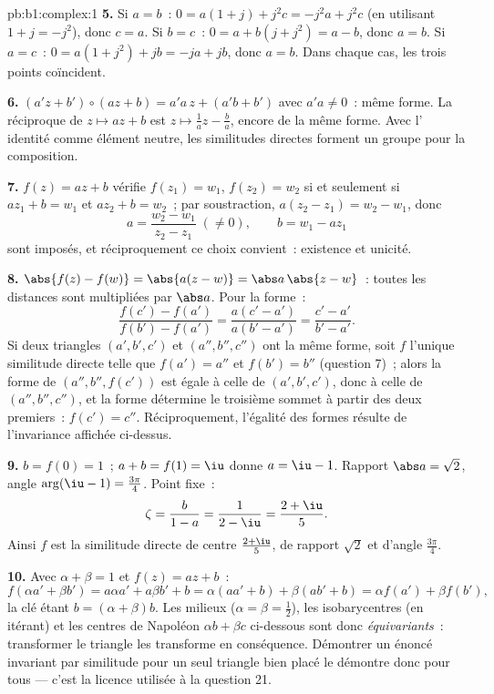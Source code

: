 \begin{solution}{pb:b1:complex:1}
\textbf{5.} Si $a = b$~: $0 = a(1 + j) + j^2 c = -j^2 a + j^2 c$ (en
utilisant $1 + j = -j^2$), donc $c = a$. Si $b = c$~: $0 = a + b(j +
j^2) = a - b$, donc $a = b$. Si $a = c$~: $0 = a(1 + j^2) + jb = -ja
+ jb$, donc $a = b$. Dans chaque cas, les trois points coïncident.

\textbf{6.} $(a'z + b') \circ (az + b) = a'a\,z + (a'b + b')$ avec
$a'a \neq 0$~: même forme. La réciproque de $z \mapsto az + b$ est
$z \mapsto \frac1a z - \frac ba$, encore de la même forme. Avec
l' identité comme élément neutre, les similitudes
directes forment un groupe pour la composition.

\textbf{7.} $f(z) = az + b$ vérifie $f(z_1) = w_1$, $f(z_2) = w_2$
si et seulement si $a z_1 + b = w_1$ et $a z_2 + b = w_2$~; par
soustraction, $a(z_2 - z_1) = w_2 - w_1$, donc
\[
a = \frac{w_2 - w_1}{z_2 - z_1} \;(\neq 0), \qquad
b = w_1 - a z_1
\]
sont imposés, et réciproquement ce choix convient~: existence et
unicité.

\textbf{8.} $\abs{f(z) - f(w)} = \abs{a(z - w)} = \abs a\,\abs{z -
w}$~: toutes les distances sont multipliées par $\abs a$. Pour la
forme~:
\[
\frac{f(c') - f(a')}{f(b') - f(a')} = \frac{a(c' -
a')}{a(b' - a')} = \frac{c' - a'}{b' - a'} .
\]
Si deux triangles $(a', b', c')$ et $(a'', b'', c'')$ ont la même
forme, soit $f$ l'unique similitude directe telle que $f(a') = a''$
et $f(b') = b''$ (question 7)~; alors la forme de $(a'', b'',
f(c'))$ est égale à celle de $(a', b', c')$, donc à celle de $(a'',
b'', c'')$, et la forme détermine le troisième sommet à partir des
deux premiers~: $f(c') = c''$. Réciproquement, l'égalité des formes
résulte de l'invariance affichée ci-dessus.

\textbf{9.} $b = f(0) = 1$~; $a + b = f(1) = \iu$ donne $a = \iu -
1$. Rapport $\abs a = \sqrt2$, angle $\arg(\iu - 1) =
\frac{3\pi}4$. Point fixe~:
\[
\zeta = \frac{b}{1 - a} = \frac1{2 - \iu} = \frac{2 + \iu}5 .
\]
Ainsi $f$ est la similitude directe de centre $\frac{2+\iu}5$, de
rapport $\sqrt2$ et d'angle $\frac{3\pi}4$.

\textbf{10.} Avec $\alpha + \beta = 1$ et $f(z) = az + b$~:
\[
f(\alpha a' + \beta b') = a\alpha a' + a\beta b' + b
= \alpha(a a' + b) + \beta(a b' + b)
= \alpha f(a') + \beta f(b') ,
\]
la clé étant $b = (\alpha + \beta)b$. Les milieux ($\alpha = \beta =
\frac12$), les isobarycentres (en itérant) et les centres de
Napoléon $\alpha b + \beta c$ ci-dessous sont donc
\emph{équivariants}~: transformer le triangle les transforme en
conséquence. Démontrer un énoncé invariant par similitude pour un
seul triangle bien placé le démontre donc pour tous --- c'est la
licence utilisée à la question 21.


\end{solution}
